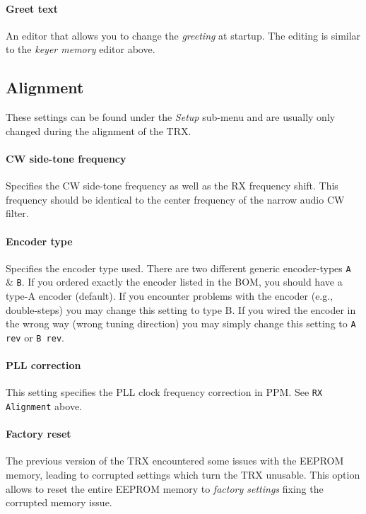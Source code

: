 \documentclass[10pt, a4paper,twoside,openright]{scrartcl}
\begin{document}
\paragraph{Greet text}
An editor that allows you to change the \emph{greeting} at startup. The editing is similar to the \emph{keyer memory} editor above.


\subsection{Alignment}
These settings can be found under the \emph{Setup} sub-menu and are usually only changed during the alignment of the TRX. 

\paragraph{CW side-tone frequency}
Specifies the CW side-tone frequency as well as the RX frequency shift. This frequency should be identical to the center frequency of the narrow audio CW filter.

\paragraph{Encoder type}
Specifies the encoder type used. There are two different generic encoder-types \texttt{A} \& \texttt{B}. If you ordered exactly the encoder listed in the BOM, you should have a type-A encoder (default). If you encounter problems with the encoder (e.g., double-steps) you may change this setting to type B. If you wired the encoder in the wrong way (wrong tuning direction) you may simply change this setting to \texttt{A rev} or \texttt{B rev}. 

\paragraph{PLL correction}
This setting specifies the PLL clock frequency correction in PPM. See \texttt{RX Alignment} above.

\paragraph{Factory reset}
The previous version of the TRX encountered some issues with the EEPROM memory, leading to corrupted settings which turn the TRX unusable. This option allows to reset the entire EEPROM memory to \emph{factory settings} fixing the corrupted memory issue.
\end{document}
